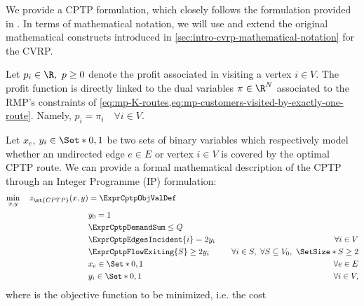 We provide a CPTP formulation, which closely follows the formulation provided in \textcite{jepsen2014}.
In terms of mathematical notation, we will use and extend the original
mathematical constructs introduced in \cref{sec:intro-cvrp-mathematical-notation} for the CVRP.

Let $p_i \in \R,\ p \ge 0$ denote the profit associated in visiting a vertex $i \in V$.
The profit function is directly linked to the dual variables $\pi \in \R^N$ associated to
the RMP's constraints of \cref{eq:mp-K-routes,eq:mp-customers-visited-by-exactly-one-route}.
Namely, $p_i = \pi_i \quad \forall i \in V$.

Let $x_{e}$, $y_{i} \in \Set*{0, 1}$ be two sets of binary variables which respectively
model whether an undirected edge $e \in E$ or vertex $i \in V$ is covered by the optimal CPTP route.
We can provide a formal mathematical description of the CPTP through an Integer Programme (IP) formulation:
\begin{align}
	\min_{x,y} \quad z_\mt{CPTP}(x, y) & = \ExprCptpObjValDef                     & \label{eq:cptp-obj-function}                                                                          \\
	                                   & y_0 = 1                                  & \label{eq:cptp-depot-part-of-tour-constraint}                                                         \\
	                                   & \ExprCptpDemandSum  \le Q                & \label{eq:cptp-resource-upper-bound-constraint}                                                       \\
	                                   & \ExprCptpEdgesIncident{i}  = 2 y_i       & \quad \forall i \in V         \label{eq:cptp-flow-conservation-constraint}                            \\
	                                   & \ExprCptpFlowExiting{S} \ge 2 y_{i}      & \quad \forall i \in S,\ \forall S \subseteq V_0,\ \SetSize*{S} \ge 2 \label{eq:cptp-gsec-constraints} \\
	                                   & x_{e}                   \in \Set*{0, 1}  & \quad \forall e \in E               \label{eq:cptp-x-mip-var-bounds}                                  \\
	                                   & y_{i}                    \in \Set*{0, 1} & \quad \forall i \in V             \label{eq:cptp-y-mip-var-bounds},
\end{align}
where  is the objective function to be minimized, i.e. the cost
